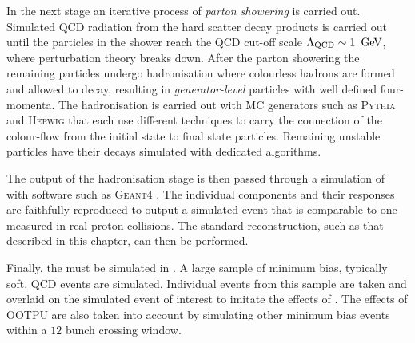 In the next stage an iterative process of \emph{parton showering} is
carried out. Simulated QCD radiation from the hard scatter decay
products is carried out until the particles in the shower reach the
QCD cut-off scale $\Lambda_{\textrm{QCD}}\sim 1~\mathrm{\,Ge\kern -0.1em V}$, where
perturbation theory breaks down. After the parton showering the
remaining particles undergo hadronisation where colourless hadrons are
formed and allowed to decay, resulting in \emph{generator-level}
particles with well defined four-momenta. The hadronisation is carried
out with MC generators such as \textsc{Pythia} \cite{Sjostrand:2007gs}
and \textsc{Herwig} \cite{Bahr:2008pv} that each use different
techniques to carry the connection of the colour-flow from the initial
state to final state particles. Remaining unstable particles have
their decays simulated with dedicated \MC algorithms.

The output of the hadronisation stage is then passed through a
simulation of \CMS with software such as \textsc{Geant4}
\cite{Agostinelli:2002hh}. The individual components and their
responses are faithfully reproduced to output a simulated event that
is comparable to one measured in real proton collisions. The standard
reconstruction, such as that described in this chapter, can then be
performed.

Finally, the \PU must be simulated in \MC. A large sample of minimum
bias, typically soft, QCD events are simulated. Individual events from
this sample are taken and overlaid on the simulated event of interest
to imitate the effects of \PU. The effects of \ac{OOTPU} are also
taken into account by simulating other minimum bias \MC events within
a $12$ bunch crossing window.

